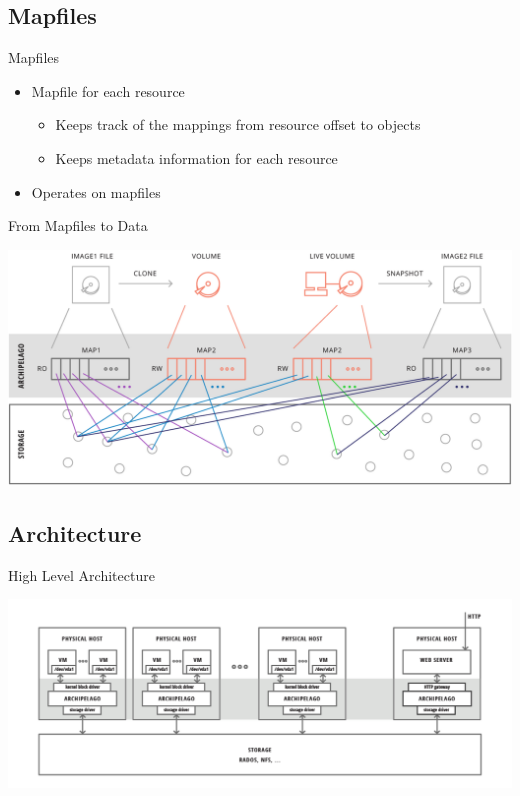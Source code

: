 \documentclass[utf8]{beamer}
\begin{document}
\subsection{Mapfiles}

\begin{frame}{Mapfiles}
  \begin{itemize}
  \item Mapfile for each resource
    \begin{itemize}
      \item Keeps track of the mappings from resource offset to objects
      \item Keeps metadata information for each resource
    \end{itemize}
  \item Operates on mapfiles
  \end{itemize}
\end{frame}

\begin{frame}{From Mapfiles to Data}
  \begin{center}
    \includegraphics[width=.90\linewidth]{figures/mapfiles.png}
  \end{center}
\end{frame}

\subsection{Architecture}

\begin{frame}{High Level Architecture}
  \begin{center}
    \includegraphics[width=.90\linewidth]{figures/high-architecture.png}
  \end{center}
\end{frame}
\end{document}
